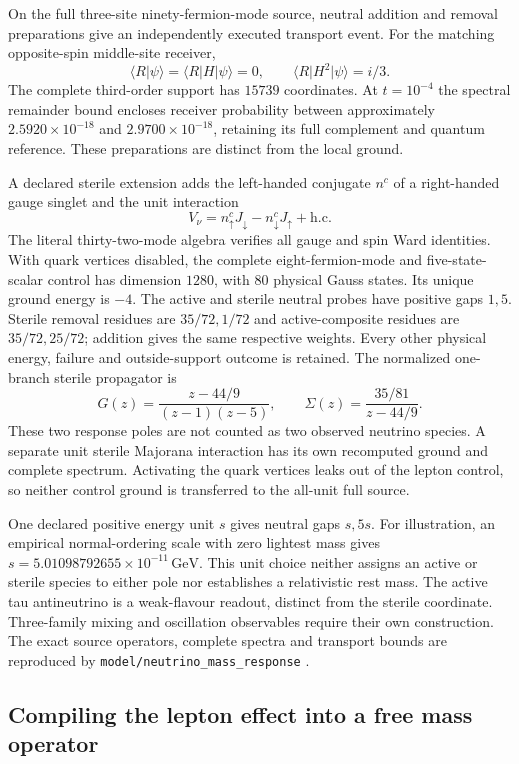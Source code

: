 On the full three-site ninety-fermion-mode source, neutral addition and
removal preparations give an independently executed transport event.
For the matching opposite-spin middle-site receiver,
\[
 \langle R|\psi\rangle=\langle R|H|\psi\rangle=0,\qquad
 \langle R|H^2|\psi\rangle=i/3.
\]
The complete third-order support has $15739$ coordinates. At
$t=10^{-4}$ the spectral remainder bound encloses receiver probability
between approximately $2.5920\times10^{-18}$ and
$2.9700\times10^{-18}$, retaining its full complement and quantum
reference. These preparations are distinct from the local ground.

A declared sterile extension adds the left-handed conjugate $n^c$ of
a right-handed gauge singlet and the unit interaction
\[
 V_\nu=n^c_\uparrow J_\downarrow-n^c_\downarrow J_\uparrow
       +\mathrm{h.c.}
\]
The literal thirty-two-mode algebra verifies all gauge and spin Ward
identities. With quark vertices disabled, the complete eight-fermion-mode
and five-state-scalar control has dimension $1280$, with $80$ physical
Gauss states. Its unique ground energy is $-4$. The active and sterile
neutral probes have positive gaps $1,5$. Sterile removal residues are
$35/72,1/72$ and active-composite residues are $35/72,25/72$;
addition gives the same respective weights. Every other physical energy,
failure and outside-support outcome is retained. The normalized
one-branch sterile propagator is
\[
 G(z)=\frac{z-44/9}{(z-1)(z-5)},\qquad
 \Sigma(z)=\frac{35/81}{z-44/9}.
\]
These two response poles are not counted as two observed neutrino
species. A separate unit sterile Majorana interaction has its own
recomputed ground and complete spectrum. Activating the quark vertices
leaks out of the lepton control, so neither control ground is transferred
to the all-unit full source.

One declared positive energy unit $s$ gives neutral gaps $s,5s$.
For illustration, an empirical normal-ordering scale with zero lightest
mass gives $s=5.01098792655\times10^{-11}\,\mathrm{GeV}$. This unit
choice neither assigns an active or sterile species to either pole nor
establishes a relativistic rest mass. The active tau antineutrino is a
weak-flavour readout, distinct from the sterile coordinate. Three-family
mixing and oscillation observables require their own construction.
The exact source operators, complete spectra and transport bounds are
reproduced by \texttt{model/neutrino\_mass\_response} \cite{ophrepo}.

\subsection{Compiling the lepton effect into a free mass operator}

